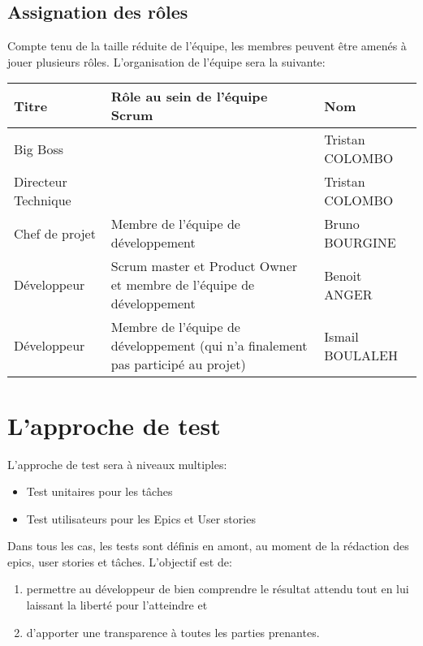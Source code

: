 \subsection{Assignation des rôles}

Compte tenu de la taille réduite de l'équipe, les membres peuvent être amenés à jouer plusieurs rôles. 
L’organisation de l'équipe sera la suivante:\\


\begin{tabular}{|l|p{8cm}|l|}
      \hline
      \rowcolor{orange} Titre & Rôle au sein de l'équipe Scrum & Nom \\
      \hline
      Big Boss & & Tristan COLOMBO \\
      \hline
      Directeur Technique & & Tristan COLOMBO \\
      \hline
      Chef de projet & Membre de l'équipe de développement & Bruno BOURGINE \\
      \hline
      Développeur & Scrum master et Product Owner et membre de l'équipe de développement & Benoit ANGER \\
      \hline
      Développeur & Membre de l'équipe de développement (qui n'a finalement pas participé au projet) & Ismail BOULALEH \\    
      \hline  
\end{tabular}

\section{L'approche de test}

L’approche de test sera à niveaux multiples:
\begin{itemize}
      \item Test unitaires pour les tâches
      \item Test utilisateurs pour les Epics et User stories
\end{itemize}


Dans tous les cas, les tests sont définis en amont, au moment de la rédaction des epics, user stories et tâches.
L’objectif est de:

\begin{enumerate}
      \item permettre au développeur de bien comprendre le résultat attendu tout en lui laissant la liberté 
      pour l’atteindre et 
      \item d’apporter une transparence à toutes les parties prenantes.
\end{enumerate}

 

